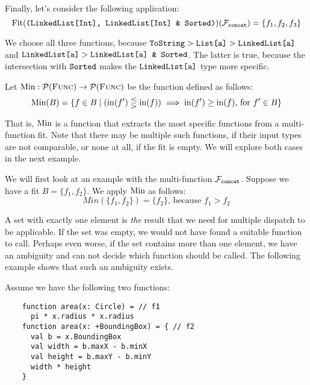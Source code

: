 \medskip
	
\noindent Finally, let's consider the following application:
\begin{equation*}
	\operatorname{Fit}(\texttt{(LinkedList[Int], LinkedList[Int] \& Sorted)})(\mathcal{F}_{\text{\texttt{concat}}}) = \{ f_1, f_2, f_3 \}
\end{equation*}
	
\noindent We choose all three functions, because $\texttt{ToString} > \texttt{List[a]} > \texttt{LinkedList[a]}$ and $ \texttt{LinkedList[a]} > \texttt{LinkedList[a] \& Sorted}$. The latter is true, because the intersection with $\texttt{Sorted}$ makes the $\texttt{LinkedList[a]}$ type more specific.


\begin{definition} \label{def:mfmin}
	Let $\operatorname{Min} : \mathcal{P}(\textsc{Func}) \rightarrow \mathcal{P}(\textsc{Func})$ be the function defined as follows:
	\begin{align*}
		\operatorname{Min}(B) = \{ f \in B \mid (\operatorname{in}(f') \lesseqgtr \operatorname{in}(f)) \implies \operatorname{in}(f') \geq \operatorname{in}(f) \text{, for } f' \in B \}
	\end{align*}
\end{definition}

\noindent That is, $\operatorname{Min}$ is a function that extracts the most specific functions from a multi-function fit. Note that there may be multiple such functions, if their input types are not comparable, or none at all, if the fit is empty. We will explore both cases in the next example.

We will first look at an example with the multi-function $\mathcal{F}_{\text{\texttt{concat}}}$. Suppose we have a fit $B = \{ f_1, f_2 \}$. We apply $\operatorname{Min}$ as follows:
\begin{equation*}
	Min(\{ f_1, f_2 \}) = \{ f_2 \} \text{, because } f_1 > f_2
\end{equation*}
	
\noindent A set with exactly one element is \textit{the} result that we need for multiple dispatch to be applicable. If the set was empty, we would not have found a suitable function to call. Perhaps even worse, if the set contains more than one element, we have an ambiguity and can not decide which function should be called. The following example shows that such an ambiguity exists.

\medskip
	
\noindent Assume we have the following two functions:
\begin{lstlisting}
    function area(x: Circle) = // f1
      pi * x.radius * x.radius 
    function area(x: +BoundingBox) = { // f2
      val b = x.BoundingBox
      val width = b.maxX - b.minX
      val height = b.maxY - b.minY
      width * height
    } 
\end{lstlisting}
	
